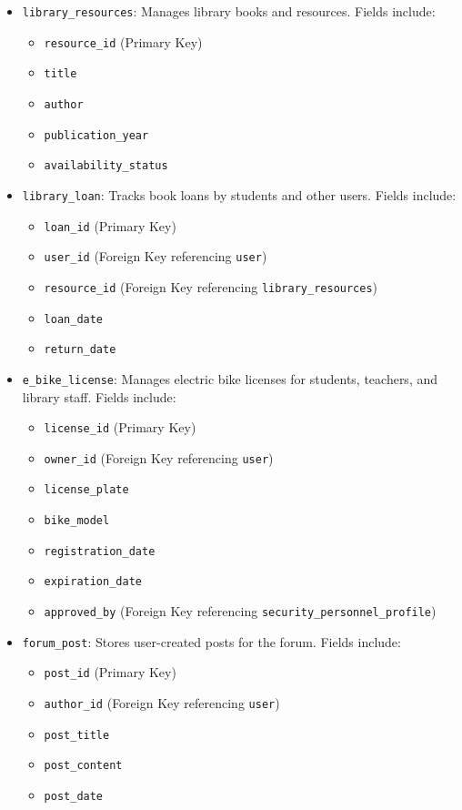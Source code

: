 \documentclass[12pt]{article}
\begin{document}
\begin{itemize}
    \item \texttt{library\_resources}: Manages library books and resources. Fields include:
    \begin{itemize}
        \item \texttt{resource\_id} (Primary Key)
        \item \texttt{title}
        \item \texttt{author}
        \item \texttt{publication\_year}
        \item \texttt{availability\_status}
    \end{itemize}
    
    \item \texttt{library\_loan}: Tracks book loans by students and other users. Fields include:
    \begin{itemize}
        \item \texttt{loan\_id} (Primary Key)
        \item \texttt{user\_id} (Foreign Key referencing \texttt{user})
        \item \texttt{resource\_id} (Foreign Key referencing \texttt{library\_resources})
        \item \texttt{loan\_date}
        \item \texttt{return\_date}
    \end{itemize}
    
    \item \texttt{e\_bike\_license}: Manages electric bike licenses for students, teachers, and library staff. Fields include:
    \begin{itemize}
        \item \texttt{license\_id} (Primary Key)
        \item \texttt{owner\_id} (Foreign Key referencing \texttt{user})
        \item \texttt{license\_plate}
        \item \texttt{bike\_model}
        \item \texttt{registration\_date}
        \item \texttt{expiration\_date}
        \item \texttt{approved\_by} (Foreign Key referencing \texttt{security\_personnel\_profile})
    \end{itemize}

    \item \texttt{forum\_post}: Stores user-created posts for the forum. Fields include:
    \begin{itemize}
        \item \texttt{post\_id} (Primary Key)
        \item \texttt{author\_id} (Foreign Key referencing \texttt{user})
        \item \texttt{post\_title}
        \item \texttt{post\_content}
        \item \texttt{post\_date}
    \end{itemize}
    

\end{itemize}
\end{document}
